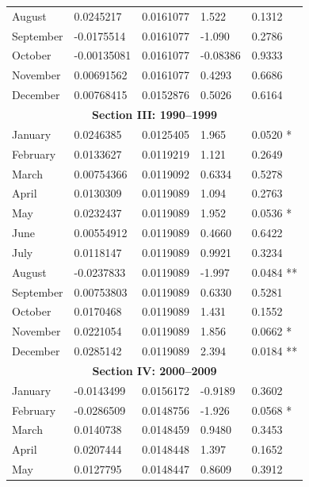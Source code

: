 \documentclass[11pt, english]{article}
\begin{document}
\begin{center}
\begin{longtable}{p{2cm}p{2cm}p{2cm}p{2cm}p{2cm}}
                August & 0.0245217 & 0.0161077 & 1.522 & 0.1312\\
                September & -0.0175514 & 0.0161077 & -1.090 & 0.2786\\
                October & -0.00135081 & 0.0161077 & -0.08386 & 0.9333\\
                November & 0.00691562 & 0.0161077 & 0.4293 & 0.6686\\
                December & 0.00768415 & 0.0152876 & 0.5026 & 0.6164\\
                \hline
		\multicolumn{5}{c}{\textbf{Section III: 1990--1999}}\\ 
                \hline
                January & 0.0246385 & 0.0125405 & 1.965 & 0.0520 *\\
                February & 0.0133627 & 0.0119219 & 1.121 & 0.2649\\
                March & 0.00754366 & 0.0119092 & 0.6334 & 0.5278\\
                April & 0.0130309 & 0.0119089 & 1.094 & 0.2763\\
                May & 0.0232437 & 0.0119089 & 1.952 & 0.0536 *\\
                June & 0.00554912 & 0.0119089 & 0.4660 & 0.6422\\
                July & 0.0118147 & 0.0119089 & 0.9921 & 0.3234\\
                August & -0.0237833 & 0.0119089 & -1.997 & 0.0484 **\\
                September & 0.00753803 & 0.0119089 & 0.6330 & 0.5281\\
                October & 0.0170468 & 0.0119089 & 1.431 & 0.1552\\
                November & 0.0221054 & 0.0119089 & 1.856 & 0.0662 *\\
                December & 0.0285142 & 0.0119089 & 2.394 & 0.0184 **\\
                \hline
                \multicolumn{5}{c}{\textbf{Section IV: 2000--2009}}\\
                \hline
                January & -0.0143499 & 0.0156172 & -0.9189 & 0.3602\\
                February & -0.0286509 & 0.0148756 & -1.926 & 0.0568 *\\
                March & 0.0140738 & 0.0148459 & 0.9480 & 0.3453\\
                April & 0.0207444 & 0.0148448 & 1.397 & 0.1652\\
                May & 0.0127795 & 0.0148447 & 0.8609 & 0.3912\\

\end{longtable}
\end{center}
\end{document}
